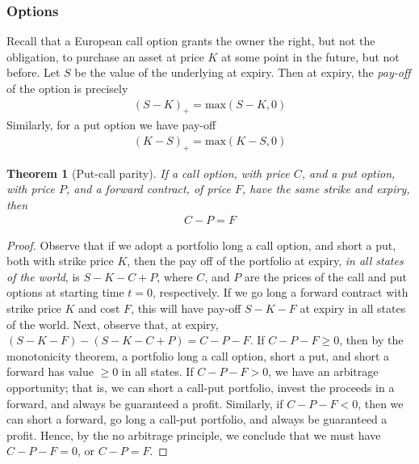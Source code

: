 \documentclass[12pt]{article}
\theoremstyle{plain}
\newtheorem{theorem}{Theorem}
\theoremstyle{definition}
\theoremstyle{remark}
\numberwithin{equation}{section}  %
\begin{document}
\subsubsection{Options}
Recall that a European call option grants the owner the right, but not the 
obligation, to purchase an asset at price $K$ at some point in the future, but 
not before. 
Let $S$ be the value of the underlying at expiry. Then at expiry, the 
\emph{pay-off} of the option is precisely
\begin{equation*}
	\begin{split}
		{(S - K)}_{+} = \text{max}(S - K, 0)
	\end{split}
\end{equation*}
Similarly, for a put option we have pay-off
\begin{equation*}
	\begin{split}
		{(K - S)}_{+} = \text{max}(K - S, 0)
	\end{split}
\end{equation*}
\begin{theorem}[Put-call parity]
	If a call option, with price $C$, and a put option, with price $P$, and a 
	forward contract, of price $F$, have the same strike and expiry, then
	\begin{equation*}\label{thm:put-call}
		\begin{split}
			C - P = F
		\end{split}
	\end{equation*}
\end{theorem}
\begin{proof}
	Observe that if we adopt a portfolio long a call option, and short a put,
	both with strike price $K$, then the pay off of the portfolio at expiry,
	\emph{in all states of the world}, is $S-K -C + P$, where $C$, and $P$ are
	the prices of the call and put options at starting time $t = 0$,
	respectively. If we go long a forward contract with strike price $K$ and
	cost $F$, this will have pay-off $S-K - F$ at expiry in all states of the
	world. 
	Next, observe that, at expiry, $(S - K - F) - (S - K - C + P) = C - P - F$.
	If $C - P - F \ge 0$, then by the monotonicity theorem, a portfolio long a
	call option, short a put, and short a forward has value $\ge 0$ in all
	states. If $C - P - F > 0$, we have an arbitrage opportunity; that is, we 
	can short a call-put portfolio, invest the proceeds in a forward, and 
	always be guaranteed a profit.
	Similarly, if $C - P - F < 0$, then we can short a forward, go long a 
	call-put portfolio, and always be guaranteed a profit. Hence, by the no 
	arbitrage principle, we
	conclude that we must have $C - P - F = 0$, or $C - P = F$. 
\end{proof}
\end{document}
